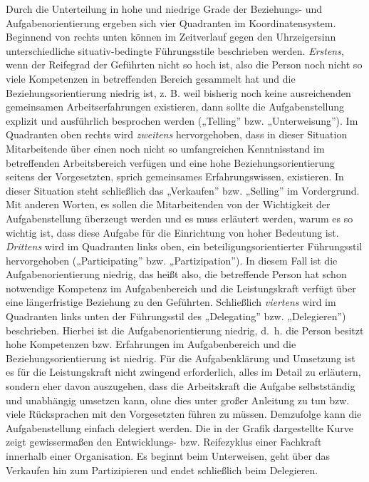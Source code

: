 \documentclass[
  letterpaper,
]{book}
\begin{document}
Durch die Unterteilung in hohe und niedrige Grade der Beziehungs- und
Aufgabenorientierung ergeben sich vier Quadranten im Koordinatensystem.
Beginnend von rechts unten können im Zeitverlauf gegen den Uhrzeigersinn
unterschiedliche situativ-bedingte Führungsstile beschrieben werden.
\emph{Erstens}, wenn der Reifegrad der Geführten nicht so hoch ist, also
die Person noch nicht so viele Kompetenzen in betreffenden Bereich
gesammelt hat und die Beziehungsorientierung niedrig ist, z. B. weil
bisherig noch keine ausreichenden gemeinsamen Arbeitserfahrungen
existieren, dann sollte die Aufgabenstellung explizit und ausführlich
besprochen werden („Telling'' bzw. „Unterweisung''). Im Quadranten oben
rechts wird \emph{zweitens} hervorgehoben, dass in dieser Situation
Mitarbeitende über einen noch nicht so umfangreichen Kenntnisstand im
betreffenden Arbeitsbereich verfügen und eine hohe
Beziehungsorientierung seitens der Vorgesetzten, sprich gemeinsames
Erfahrungswissen, existieren. In dieser Situation steht schließlich das
„Verkaufen'' bzw. „Selling'' im Vordergrund. Mit anderen Worten, es
sollen die Mitarbeitenden von der Wichtigkeit der Aufgabenstellung
überzeugt werden und es muss erläutert werden, warum es so wichtig ist,
dass diese Aufgabe für die Einrichtung von hoher Bedeutung ist.
\emph{Drittens} wird im Quadranten links oben, ein
beteiligungsorientierter Führungsstil hervorgehoben („Participating''
bzw. „Partizipation''). In diesem Fall ist die Aufgabenorientierung
niedrig, das heißt also, die betreffende Person hat schon notwendige
Kompetenz im Aufgabenbereich und die Leistungskraft verfügt über eine
längerfristige Beziehung zu den Geführten. Schließlich \emph{viertens}
wird im Quadranten links unten der Führungsstil des „Delegating'' bzw.
„Delegieren'') beschrieben. Hierbei ist die Aufgabenorientierung
niedrig, d.~h. die Person besitzt hohe Kompetenzen bzw. Erfahrungen im
Aufgabenbereich und die Beziehungsorientierung ist niedrig. Für die
Aufgabenklärung und Umsetzung ist es für die Leistungskraft nicht
zwingend erforderlich, alles im Detail zu erläutern, sondern eher davon
auszugehen, dass die Arbeitskraft die Aufgabe selbstständig und
unabhängig umsetzen kann, ohne dies unter großer Anleitung zu tun bzw.
viele Rücksprachen mit den Vorgesetzten führen zu müssen. Demzufolge
kann die Aufgabenstellung einfach delegiert werden. Die in der Grafik
dargestellte Kurve zeigt gewissermaßen den Entwicklungs- bzw.
Reifezyklus einer Fachkraft innerhalb einer Organisation. Es beginnt
beim Unterweisen, geht über das Verkaufen hin zum Partizipieren und
endet schließlich beim Delegieren.
\end{document}
